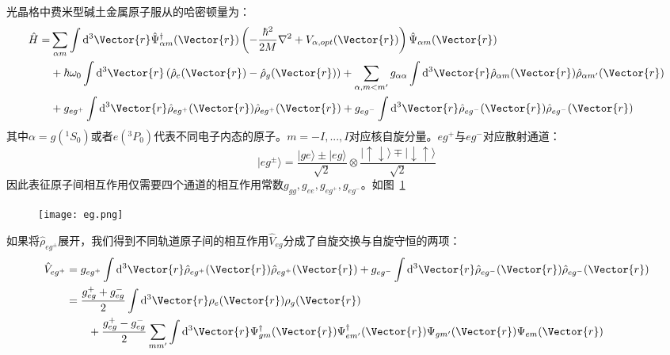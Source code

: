 光晶格中费米型碱土金属原子服从的哈密顿量为：
\begin{equation}
\begin{aligned}
\hat{H}=& \sum_{\alpha m} \int \mathrm{d}^{3} \Vector{r} \hat{\Psi}_{\alpha m}^{\dagger}(\Vector{r})\left(-\frac{\hbar^{2}}{2 M} \nabla^{2}+V_{\alpha,opt}(\Vector{r})\right) \hat{\Psi}_{\alpha m}(\Vector{r}) \\
&+\hbar \omega_{0} \int \mathrm{d}^{3} \Vector{r}\left(\hat{\rho}_{e}(\Vector{r})-\hat{\rho}_{g}(\Vector{r})\right)+ \sum_{\alpha, m<m^{\prime}} g_{\alpha \alpha} \int \mathrm{d}^{3} \Vector{r} \hat{\rho}_{\alpha m}(\Vector{r}) \hat{\rho}_{\alpha m^{\prime}}(\Vector{r})  \\
&+ g_{e g^+} \int \mathrm{d}^{3} \Vector{r} \hat{\rho}_{eg^+}(\Vector{r}) \hat{\rho}_{eg^+}(\Vector{r})+g_{e g^-} \int \mathrm{d}^{3} \Vector{r} \hat{\rho}_{eg^-}(\Vector{r}) \hat{\rho}_{eg^-}(\Vector{r})\\
\end{aligned}
\end{equation}
其中$\alpha=g({^1S_0})$或者$e({}^3P_0)$代表不同电子内态的原子。$m=-I,...,I$对应核自旋分量。$eg^+$与$eg^-$对应散射通道：
\begin{equation}
|eg^{\pm}\rangle = \frac{|ge\rangle\pm|eg\rangle}{\sqrt{2}}\otimes\frac{|\uparrow\downarrow\rangle\mp|\downarrow\uparrow \rangle}{\sqrt{2}}
\end{equation}
因此表征原子间相互作用仅需要四个通道的相互作用常数$g_{gg},g_{ee},g_{eg^+},g_{eg^-}$。如图~\ref{eg}~
\begin{figure}[!htbp]
    \centering
    \texttt{[image: eg.png]}
    \label{eg}
\end{figure}
如果将$\hat{\rho}_{eg^\pm}$展开，我们得到不同轨道原子间的相互作用$\hat{V}_{eg}$分成了自旋交换与自旋守恒的两项：
\begin{equation}
\begin{aligned}
\hat{V}_{eg^+} &= g_{e g^+} \int \mathrm{d}^{3} \Vector{r} \hat{\rho}_{eg^+}(\Vector{r}) \hat{\rho}_{eg^+}(\Vector{r})+g_{e g^-} \int \mathrm{d}^{3} \Vector{r} \hat{\rho}_{eg^-}(\Vector{r}) \hat{\rho}_{eg^-}(\Vector{r})\\
\quad &= \frac{g_{e g}^{+}+g_{e g}^{-}}{2} \int \mathrm{d}^{3} \Vector{r} \rho_{e}(\Vector{r}) \rho_{g}(\Vector{r}) \\ 
&\quad \quad + \frac{g_{e g}^{+}-g_{e g}^{-}}{2} \sum_{m m^{\prime}} \int \mathrm{d}^{3} \Vector{r} \Psi_{g m}^{\dagger}(\Vector{r}) \Psi_{e m^{\prime}}^{\dagger}(\Vector{r}) \Psi_{g m^{\prime}}(\Vector{r}) \Psi_{e m}(\Vector{r})
\end{aligned}
\end{equation}
